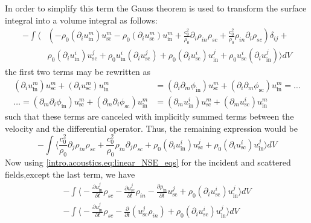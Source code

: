 In order to simplify this term the Gauss theorem is used to transform the surface integral into a volume integral as follows: 
\begin{align}\label{intro.arf.eq:force_in_sc_gauss}
    -\int\bigg\langle&\left(-\rho_0(\partial_iu_{\text{in}}^{m})u_{\text{sc}}^{m} - \rho_0 (\partial_iu_{\text{sc}}^{m})u_{\text{in}}^{m} + \frac{c_0^2}{\rho_0}\partial_i\rho_{in}\rho_{sc} + \frac{c_0^2}{\rho_0}\rho_{in}\partial_i\rho_{sc}\right)\delta_{ij} + \nonumber\\
    &\rho_0(\partial_{i}u_{\text{in}}^{i})u_{\text{sc}}^{j} + \rho_0u_{\text{in}}^{i}(\partial_{i}u_{\text{sc}}^{j}) + \rho_0(\partial_{i}u_{\text{sc}}^{i})u_{\text{in}}^{j} + \rho_0u_{\text{sc}}^{i}(\partial_{i}u_{\text{in}}^{j})\bigg\rangle dV
\end{align}
the first two terms may be rewritten as
\begin{align}
    (\partial_iu_{\text{in}}^{m})u_{\text{sc}}^{m} + (\partial_iu_{\text{sc}}^{m})u_{\text{in}}^{m} &= (\partial_i\partial_m\phi_{\text{in}})u_{\text{sc}}^{m} + (\partial_i\partial_m\phi_{\text{sc}})u_{\text{in}}^{m} = \dots\nonumber\\
    \dots=(\partial_m\partial_i\phi_{\text{in}})u_{\text{sc}}^{m} + (\partial_m\partial_i\phi_{\text{sc}})u_{\text{in}}^{m} &= (\partial_mu_{\text{in}}^{i})u_{\text{sc}}^{m} + (\partial_mu_{\text{sc}}^{i})u_{\text{in}}^{m}
\end{align}
such that these terms are canceled with implicitly summed terms between the velocity and the differential operator. Thus, the remaining expression would be
\begin{equation}
    -\int\bigg\langle\frac{c_0^2}{\rho_0}\partial_j\rho_{in}\rho_{sc} + \frac{c_0^2}{\rho_0}\rho_{in}\partial_j\rho_{sc} + \rho_0(\partial_{i}u_{\text{in}}^{i})u_{\text{sc}}^{j} + \rho_0(\partial_{i}u_{\text{sc}}^{i})u_{\text{in}}^{j}\bigg\rangle dV
\end{equation}
Now using \eqref{intro.acoustics.eq:linear_NSE_eqs} for the incident and scattered fields,except the last term, we have
\begin{align}
    -\int\bigg\langle-\frac{\partial u_{\text{in}}^{j}}{\partial t}\rho_{sc} - \frac{\partial u_{\text{sc}}^{j}}{\partial t}\rho_{in} -\frac{\partial\rho_{\text{in}}}{\partial t}u_{\text{sc}}^{j} + \rho_0(\partial_{i}u_{\text{sc}}^{i})u_{\text{in}}^{j}\bigg\rangle dV \nonumber\\
    -\int\bigg\langle-\frac{\partial u_{\text{in}}^{j}}{\partial t}\rho_{sc} - \frac{\partial}{\partial t}(u_{\text{sc}}^{j}\rho_{in}) + \rho_0(\partial_{i}u_{\text{sc}}^{i})u_{\text{in}}^{j}\bigg\rangle dV 
\end{align}

